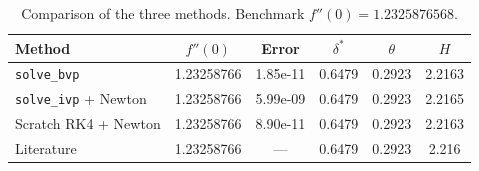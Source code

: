 \begin{table}[htbp]
  \centering
  \caption{Comparison of the three methods. Benchmark $f''(0) = 1.2325876568$.}
  \label{tab:comparison}
  \begin{tabular}{lccccc}
    \toprule
    Method & $f''(0)$ & Error & $\delta^*$ & $\theta$ & $H$ \\
    \midrule
    \texttt{solve\_bvp} & 1.23258766 & 1.85e-11 & 0.6479 & 0.2923 & 2.2163 \\
    \texttt{solve\_ivp} + Newton & 1.23258766 & 5.99e-09 & 0.6479 & 0.2923 & 2.2165 \\
    Scratch RK4 + Newton & 1.23258766 & 8.90e-11 & 0.6479 & 0.2923 & 2.2163 \\
    \midrule
    Literature & 1.23258766 & --- & 0.6479 & 0.2923 & 2.216 \\
    \bottomrule
  \end{tabular}
\end{table}
